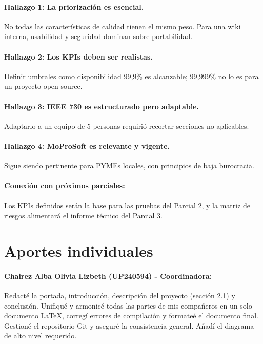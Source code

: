\documentclass[12pt]{article}
\begin{document}
\paragraph{Hallazgo 1: La priorización es esencial.} No todas las características de calidad tienen el mismo peso. Para una wiki interna, usabilidad y seguridad dominan sobre portabilidad.

\paragraph{Hallazgo 2: Los KPIs deben ser realistas.} Definir umbrales como disponibilidad 99,9\% es alcanzable; 99,999\% no lo es para un proyecto open-source.

\paragraph{Hallazgo 3: IEEE 730 es estructurado pero adaptable.} Adaptarlo a un equipo de 5 personas requirió recortar secciones no aplicables.

\paragraph{Hallazgo 4: MoProSoft es relevante y vigente.} Sigue siendo pertinente para PYMEs locales, con principios de baja burocracia.

\paragraph{Conexión con próximos parciales:} Los KPIs definidos serán la base para las pruebas del Parcial 2, y la matriz de riesgos alimentará el informe técnico del Parcial 3.

\newpage
\section{Aportes individuales}

\paragraph{Chairez Alba Olivia Lizbeth (UP240594) - Coordinadora:}
Redacté la portada, introducción, descripción del proyecto (sección 2.1) y conclusión. Unifiqué y armonicé todas las partes de mis compañeros en un solo documento LaTeX, corregí errores de compilación y formateé el documento final. Gestioné el repositorio Git y aseguré la consistencia general. Añadí el diagrama de alto nivel requerido.
\end{document}
